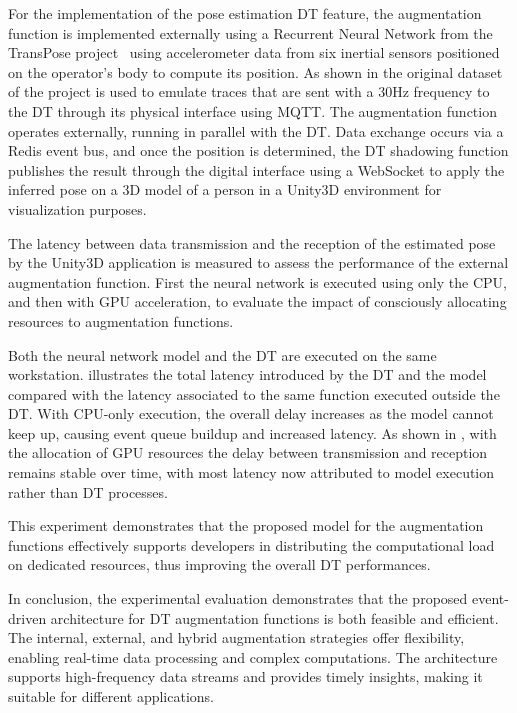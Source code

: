 For the implementation of the pose estimation \ac{DT} feature,
the augmentation function is implemented externally using a Recurrent Neural Network from the TransPose project~\cite{TransPoseSIGGRAPH2021} using accelerometer data from six inertial sensors positioned on the operator's body to compute its position.
%
As shown in  the original dataset of the project is used to emulate traces that are sent with a 30Hz frequency to the \ac{DT} through its physical interface using MQTT.
%
The augmentation function operates externally, running in parallel with the DT. Data exchange occurs via a Redis event bus, and once the position is determined, the \ac{DT} shadowing function publishes the result through the digital interface using a WebSocket to apply the inferred pose on a 3D model of a person in a Unity3D environment for visualization purposes.

The latency between data transmission and the reception of the estimated pose by the Unity3D application is measured to assess the performance of the external augmentation function.
%
First the neural network is executed using only the CPU, and then with GPU acceleration, to evaluate the impact of consciously allocating resources to augmentation functions.

Both the neural network model and the DT are executed on the same workstation.  illustrates the total latency introduced by the DT and the model compared with the latency associated to the same function executed outside the DT.
%
With CPU-only execution, the overall delay increases as the model cannot keep up, causing event queue buildup and increased latency. 
As shown in , with the allocation of GPU resources the delay between transmission and reception remains stable over time, with most latency now attributed to model execution rather than DT processes.

This experiment demonstrates that the proposed model for the augmentation functions effectively supports developers in distributing the computational load on dedicated resources, thus improving the overall \ac{DT} performances. 

In conclusion, the experimental evaluation demonstrates that the proposed event-driven architecture for DT augmentation functions is both feasible and efficient.
The internal, external, and hybrid augmentation strategies offer flexibility, enabling real-time data processing and complex computations.
The architecture supports high-frequency data streams and provides timely insights, making it suitable for different applications.


